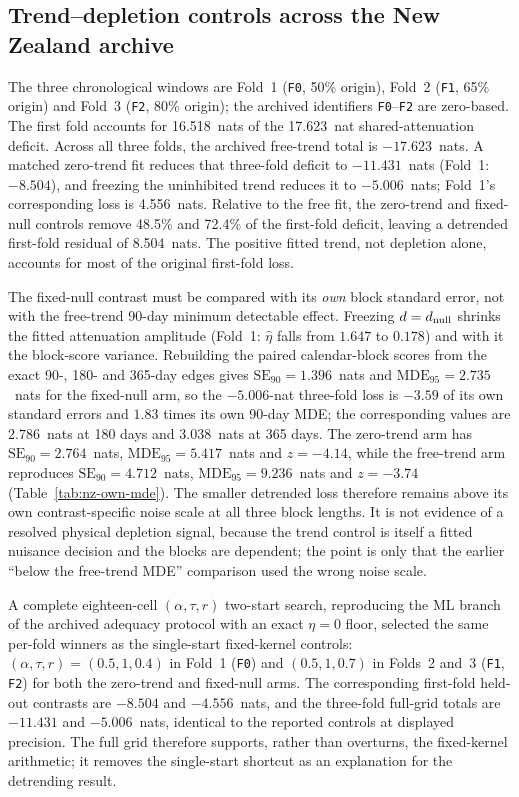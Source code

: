 \subsection{Trend--depletion controls across the New Zealand archive}\label{sec:nz-trend-controls}
The three chronological windows are Fold~1 (\texttt{F0}, 50\% origin), Fold~2 (\texttt{F1}, 65\% origin) and Fold~3 (\texttt{F2}, 80\% origin); the archived identifiers \texttt{F0}--\texttt{F2} are zero-based. The first fold accounts for 16.518~nats of the 17.623~nat shared-attenuation deficit. Across all three folds, the archived free-trend total is $-17.623$~nats. A matched zero-trend fit reduces that three-fold deficit to $-11.431$~nats (Fold~1: $-8.504$), and freezing the uninhibited trend reduces it to $-5.006$~nats; Fold~1's corresponding loss is 4.556~nats. Relative to the free fit, the zero-trend and fixed-null controls remove 48.5\% and 72.4\% of the first-fold deficit, leaving a detrended first-fold residual of 8.504~nats. The positive fitted trend, not depletion alone, accounts for most of the original first-fold loss.

The fixed-null contrast must be compared with its \emph{own} block standard error, not with the free-trend 90-day minimum detectable effect. Freezing $d=d_{\rm null}$ shrinks the fitted attenuation amplitude (Fold~1: $\hat\eta$ falls from $1.647$ to $0.178$) and with it the block-score variance. Rebuilding the paired calendar-block scores from the exact 90-, 180- and 365-day edges gives $\mathrm{SE}_{90}=1.396$~nats and $\mathrm{MDE}_{95}=2.735$~nats for the fixed-null arm, so the $-5.006$-nat three-fold loss is $-3.59$ of its own standard errors and $1.83$ times its own 90-day MDE; the corresponding values are $2.786$~nats at 180 days and $3.038$~nats at 365 days. The zero-trend arm has $\mathrm{SE}_{90}=2.764$~nats, $\mathrm{MDE}_{95}=5.417$~nats and $z=-4.14$, while the free-trend arm reproduces $\mathrm{SE}_{90}=4.712$~nats, $\mathrm{MDE}_{95}=9.236$~nats and $z=-3.74$ (Table~\ref{tab:nz-own-mde}). The smaller detrended loss therefore remains above its own contrast-specific noise scale at all three block lengths. It is not evidence of a resolved physical depletion signal, because the trend control is itself a fitted nuisance decision and the blocks are dependent; the point is only that the earlier ``below the free-trend MDE'' comparison used the wrong noise scale.

A complete eighteen-cell $(\alpha,\tau,r)$ two-start search, reproducing the ML branch of the archived adequacy protocol with an exact $\eta=0$ floor, selected the same per-fold winners as the single-start fixed-kernel controls: $(\alpha,\tau,r)=(0.5,1,0.4)$ in Fold~1 (\texttt{F0}) and $(0.5,1,0.7)$ in Folds~2 and~3 (\texttt{F1}, \texttt{F2}) for both the zero-trend and fixed-null arms. The corresponding first-fold held-out contrasts are $-8.504$ and $-4.556$~nats, and the three-fold full-grid totals are $-11.431$ and $-5.006$~nats, identical to the reported controls at displayed precision. The full grid therefore supports, rather than overturns, the fixed-kernel arithmetic; it removes the single-start shortcut as an explanation for the detrending result.

